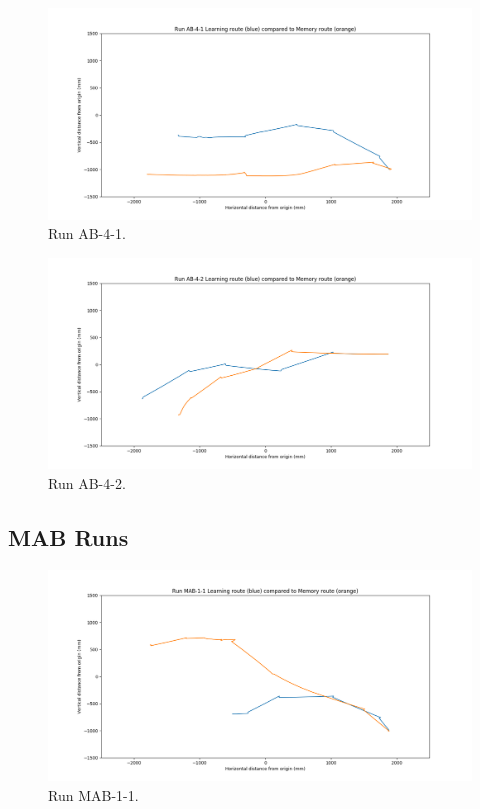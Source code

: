 \documentclass[a4paper,11pt,twoside,openright]{article}
\begin{document}
\begin{figure}[h!]
 \centering
  \includegraphics[width=\textwidth]{AB-4-1}
  \caption{
    \label{fig:ab-4-1} Run AB-4-1.
  }
\end{figure}

\begin{figure}[h!]
 \centering
  \includegraphics[width=\textwidth]{AB-4-2}
  \caption{
    \label{fig:ab-4-2} Run AB-4-2.
  }
\end{figure}
\FloatBarrier
\newpage

\subsection{MAB Runs}

\begin{figure}[h!]
 \centering
  \includegraphics[width=\textwidth]{MAB-1-1}
  \caption{
    \label{fig:mab-1-1} Run MAB-1-1.
  }
\end{figure}
\end{document}
